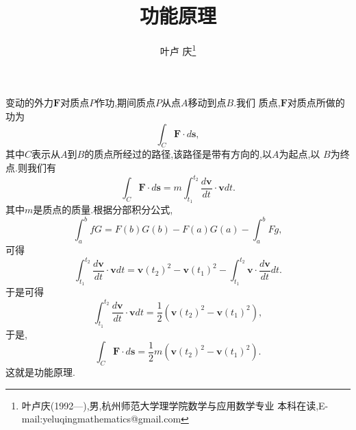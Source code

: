 \documentclass[a4paper]{article}
\begin{document}
\title{\huge{\bf{功能原理}}} \author{\small{叶卢
    庆\footnote{叶卢庆(1992---),男,杭州师范大学理学院数学与应用数学专业
      本科在读,E-mail:yeluqingmathematics@gmail.com}}}
\maketitle\ni
变动的外力$\mathbf{F}$对质点$P$作功,期间质点$P$从点$A$移动到点$B$.我们
质点,$\mathbf{F}$对质点所做的功为
$$
\int_C \mathbf{F}\cdot d\mathbf{s},
$$
其中$C$表示从$A$到$B$的质点所经过的路径,该路径是带有方向的,以$A$为起点,以
$B$为终点.则我们有
$$
\int_C \mathbf{F}\cdot d\mathbf{s}=m\int_{t_{1}}^{t_{2}}
\frac{d\mathbf{v}}{dt}\cdot
\mathbf{v}dt.
$$
其中$m$是质点的质量.根据分部积分公式,
$$
\int_a^bfG=F(b)G(b)-F(a)G(a)-\int_a^bFg,
$$
可得
$$
\int_{t_1}^{t_2}\frac{d\mathbf{v}}{dt}\cdot
\mathbf{v}dt=\mathbf{v}(t_2)^2-\mathbf{v}(t_1)^2-\int_{t_1}^{t_2}\mathbf{v}\cdot \frac{d\mathbf{v}}{dt}dt.
$$
于是可得
$$
\int_{t_1}^{t_2}\frac{d\mathbf{v}}{dt}\cdot \mathbf{v}dt=\frac{1}{2}(\mathbf{v}(t_2)^2-\mathbf{v}(t_1)^2),
$$
于是,
$$
\int_C\mathbf{F}\cdot d\mathbf{s}=\frac{1}{2}m(\mathbf{v}(t_2)^2-\mathbf{v}(t_1)^2).
$$
这就是功能原理.
\end{document}
